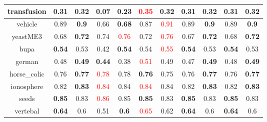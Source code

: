 \documentclass{article}%
\begin{document}
\begin{tabular}{c|cccccccccc}
\hline%
transfusion&0.31&\textbf{0.32}&0.07&\textbf{0.23}&\textcolor{red}{ 
0.35
}&0.32&0.31&\textbf{0.32}&0.31&\textbf{0.32}\\%
\hline%
vehicle&0.89&\textbf{0.9}&0.66&\textbf{0.68}&0.87&\textcolor{red}{ 
0.91
}&0.89&\textbf{0.9}&0.89&\textbf{0.9}\\%
\hline%
yeastME3&0.68&\textbf{0.72}&0.74&\textcolor{red}{ 
0.76
}&0.72&\textcolor{red}{ 
0.76
}&0.67&\textbf{0.72}&0.68&\textbf{0.72}\\%
\hline%
bupa&\textbf{0.54}&0.53&0.42&\textbf{0.54}&0.54&\textcolor{red}{ 
0.55
}&\textbf{0.54}&0.53&\textbf{0.54}&0.53\\%
\hline%
german&0.48&\textbf{0.49}&\textbf{0.44}&0.38&\textcolor{red}{ 
0.51
}&0.49&0.47&\textbf{0.49}&0.48&\textbf{0.49}\\%
\hline%
horse\_colic&0.76&\textbf{0.77}&\textcolor{red}{ 
0.78
}&0.78&\textbf{0.76}&0.75&0.76&\textbf{0.77}&0.76&\textbf{0.77}\\%
\hline%
ionosphere&0.82&\textbf{0.83}&\textcolor{red}{ 
0.84
}&0.84&\textcolor{red}{ 
0.84
}&0.84&0.82&\textbf{0.83}&0.82&\textbf{0.83}\\%
\hline%
seeds&\textbf{0.85}&0.83&\textcolor{red}{ 
0.86
}&0.85&\textbf{0.85}&0.83&\textbf{0.85}&0.83&\textbf{0.85}&0.83\\%
\hline%
vertebal&\textbf{0.64}&0.6&0.51&\textbf{0.6}&\textcolor{red}{ 
0.65
}&0.62&\textbf{0.64}&0.6&\textbf{0.64}&0.6\\%
\hline%
\end{tabular}

%
\end{document}
